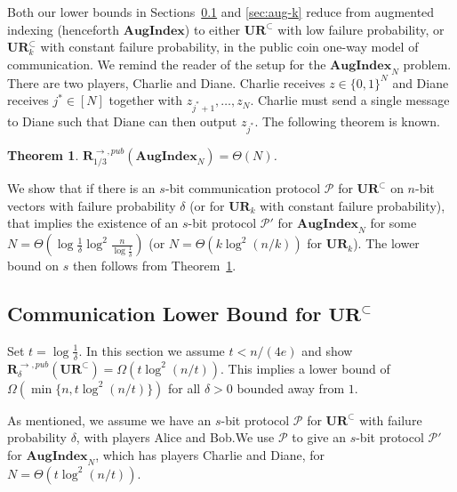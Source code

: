 \documentclass[11pt]{article}
\newtheorem{theorem}{Theorem}
\newcommand{\aug}{\mathbf{AugIndex}\xspace}
\newcommand{\ur}{\mathbf{UR}\xspace}
\newcommand{\randcom}{\mathbf{R}}
\begin{document}
Both our lower bounds in Sections~\ref{sec:aug-delta} and \ref{sec:aug-k} reduce from augmented indexing (henceforth $\aug$) to either $\ur^\subset$ with low failure probability, or $\ur_k^\subset$ with constant failure probability, in the public coin one-way model of communication. We remind the reader of the setup for the $\aug_N$ problem. There are two players, Charlie and Diane. Charlie receives $z\in\{0,1\}^N$ and Diane receives $j^*\in[N]$ together with $z_{j^*+1},\ldots,z_N$. Charlie must send a single message to Diane such that Diane can then output $z_{j^*}$. The following theorem is known.

\begin{theorem}{\cite{MiltersenNSW98}}\label{thm:mnsw}
$\randcom^{\rightarrow,pub}_{1/3}(\aug_N) = \Theta(N)$.
\end{theorem}

We show that if there is an $s$-bit communication protocol $\mathcal P$ for $\ur^\subset$ on $n$-bit vectors with failure probability $\delta$ (or for $\ur_k$ with constant failure probability), that implies the existence of an $s$-bit protocol $\mathcal P'$ for $\aug_N$ for some $N=\Theta(\log\frac 1{\delta}\log^2\frac n{\log\frac 1{\delta}})$ (or $N=\Theta(k\log^2(n/k))$ for $\ur_k$). The lower bound on $s$ then follows from Theorem~\ref{thm:mnsw}.


\subsection{Communication Lower Bound for $\ur^\subset$}\label{sec:aug-delta}

Set $t = \log \frac 1{\delta}$. In this section we assume $t < n/(4e)$ and show $\randcom^{\rightarrow,pub}_\delta(\ur^\subset) = \Omega(t\log^2(n/t))$. This implies a lower bound of $\Omega(\min\{n, t\log^2(n/t)\})$ for all $\delta>0$ bounded away from $1$.

As mentioned, we assume we have an $s$-bit protocol $\mathcal P$ for $\ur^\subset$ with failure probability $\delta$, with players Alice and Bob.We use $\mathcal P$ to give an $s$-bit protocol $\mathcal P'$ for $\aug_N$, which has players Charlie and Diane, for $N = \Theta(t\log^2(n/t))$.
\end{document}
